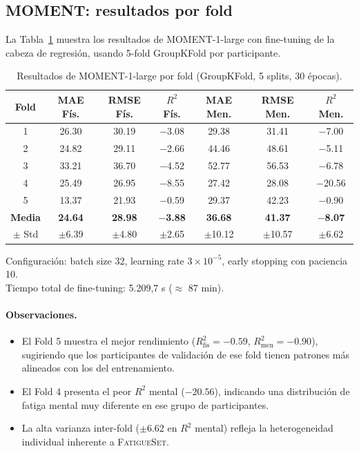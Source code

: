 \documentclass[12pt, a4paper]{article}
\newcommand{\fatigueset}{\textsc{FatigueSet}}
\newcommand{\moment}{\textsc{MOMENT}}
\begin{document}
\subsection{MOMENT: resultados por fold}

La Tabla~\ref{tab:moment_folds} muestra los resultados de \moment{}-1-large con fine-tuning de la cabeza de regresión, usando 5-fold GroupKFold por participante.

\begin{table}[H]
\centering
\caption{Resultados de MOMENT-1-large por fold (GroupKFold, 5 splits, 30 épocas).}
\label{tab:moment_folds}
\small
\begin{tabular}{@{}ccccccc@{}}
\toprule
\textbf{Fold} & \textbf{MAE Fís.} & \textbf{RMSE Fís.} & \textbf{$R^2$ Fís.} & \textbf{MAE Men.} & \textbf{RMSE Men.} & \textbf{$R^2$ Men.} \\
\midrule
1 & 26.30 & 30.19 & $-$3.08 & 29.38 & 31.41 & $-$7.00 \\
2 & 24.82 & 29.11 & $-$2.66 & 44.46 & 48.61 & $-$5.11 \\
3 & 33.21 & 36.70 & $-$4.52 & 52.77 & 56.53 & $-$6.78 \\
4 & 25.49 & 26.95 & $-$8.55 & 27.42 & 28.08 & $-$20.56 \\
5 & 13.37 & 21.93 & $-$0.59 & 29.37 & 42.23 & $-$0.90 \\
\midrule
\textbf{Media} & \textbf{24.64} & \textbf{28.98} & \textbf{$-$3.88} & \textbf{36.68} & \textbf{41.37} & \textbf{$-$8.07} \\
$\pm$ Std & $\pm$6.39 & $\pm$4.80 & $\pm$2.65 & $\pm$10.12 & $\pm$10.57 & $\pm$6.62 \\
\bottomrule
\end{tabular}
\begin{flushleft}
\footnotesize
Configuración: batch size 32, learning rate $3 \times 10^{-5}$, early stopping con paciencia 10. \\
Tiempo total de fine-tuning: 5.209,7 s ($\approx$ 87 min).
\end{flushleft}
\end{table}

\paragraph{Observaciones.}
\begin{itemize}
    \item El Fold 5 muestra el mejor rendimiento ($R^2_\text{fís} = -0.59$, $R^2_\text{men} = -0.90$), sugiriendo que los participantes de validación de ese fold tienen patrones más alineados con los del entrenamiento.
    \item El Fold 4 presenta el peor $R^2$ mental ($-20.56$), indicando una distribución de fatiga mental muy diferente en ese grupo de participantes.
    \item La alta varianza inter-fold ($\pm$6.62 en $R^2$ mental) refleja la heterogeneidad individual inherente a \fatigueset{}.
\end{itemize}
\end{document}
